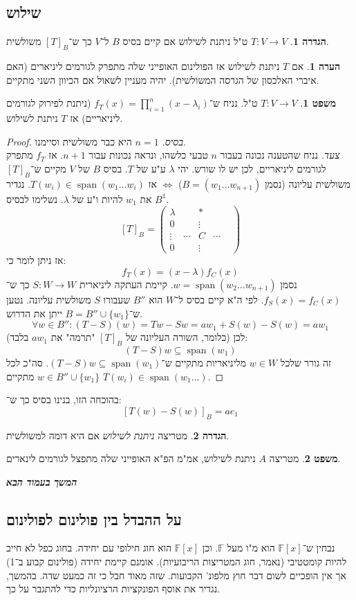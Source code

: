 \documentclass[a4paper]{article}
\newcommand\npage {\vfil {\hfil \textbf{\textit{המשך בעמוד הבא}}} \hfil \vfil \pagebreak}
\DeclareMathOperator{\Sp}      {span}
\newcommand\F         {\mathbb{F}}
\newcommand\co        {\colon}
\newcommand\pms[1]    {\begin{pmatrix}
		#1
\end{pmatrix}}
\renewcommand\lg      {\lambda}
\theoremstyle{definition}
\newtheorem{Theorem}{\color{myblue}משפט}
\newtheorem{Definition}{\color{mygreen}הגדרה}
\newtheorem{Remark}{\color{mycyan}הערה}
\newcommand\theo  [1] {\begin{Theorem}#1\end{Theorem}}
\newcommand\defi  [1] {\begin{Definition}#1\end{Definition}}
\newcommand\rmark [1] {\begin{Remark}#1\end{Remark}}
\begin{document}
	\subsection{שילוש}
	\defi{$T \co V \to V$ ט"ל ניתנת לשילוש אם קיים בסיס $B$ ל־$V$ כך ש־$[T]_B$ משולשית. }
	
	\rmark{אם $T$ ניתנת לשילוש אז הפולינום האופייני שלה מתפרק לגורמים ליניארים (האם איברי האלכסון של הגרסה המשולשית). יהיה מעניין לשאול אם הכיוון השני מתקיים. }
	
	\theo{$T \co V \to V$ ט"ל. נניח ש־$f_T(x) = \prod_{i = 1}^{n}(x - \lg_i)$ (ניתנת לפירוק לגורמים ליניאריים) אז $T$ ניתנת לשילוש. }
	\begin{proof}
		\textit{בסיס. }$n = 1$ היא כבר משולשית וסיימנו. \\
		\textit{צעד. }נניח שהטענה נכונה בעבור $n$ טבעי כלשהו, ונראה נכונות עבור $n + 1$. אז $f_T$ מתפרק לגורמים ליניאריים, לכן יש לו שורש. יהי $\lg$ ע"ע של $T$. בסיס $B$ של $V$ מקיים ש־$[T]_B$ משולשית עליונה (נסמן $B = (w_1 \dots w_{n + 1})$) $\iff$ אז $T(w_i) \in \Sp(w_1 \dots w_i)$. נגדיר את $w_1$ להיות ו"ע של $\lg$. נשלימו לבסיס $B^1$. 
		\[ [T]_B = \pms{\lg & & * && \\ 0 && \vdots \\ \vdots &\cdots & C & \cdots \\ 0 & &\vdots } \]
		אז ניתן לומר כי: 
		\[ f_T(x) = (x - \lg) f_C(x) \]
		נסמן $w = \Sp(w_2 \dots w_{n + 1})$. קיימת העתקה ליניארית $S \co W \to W$ כך ש־$f_S(x) = f_C(x)$. לפי ה"א קיים בסיס ל־$W$ הוא $B''$ שעבורו $S$ משולשית עליונה. נטען ש־$B = B'' \cup \{w_1\}$ ייתן את הדרוש. 
		\[ \forall w \in B'' \co (T - S)(w) = Tw - Sw = aw_1 + S(w) - S(w) = aw_1 \]
		(כלומר, השורה העליונה של $[T]_B$ "תרמה" את $aw_1$ בלבד)
		לכן: 
		\[ (T - S)w \subseteq \Sp(w_1) \]
		זה גורר שלכל $w \in W$ מליניאריות מתקיים ש־$(T - S)w \subseteq \Sp(w_1)$. סה"כ לכל $w \in B'' \cup \{w_1\}$ מתקיים $T(w_i) \in \Sp(w_1 \dots)$. 
	\end{proof}
	
	בהוכחה הזו, בנינו בסיס כך ש־: 
	\[ [T(w) - S(w)]_B = ae_1 \]
	
	\defi{מטריצה \textit{ניתנת לשילוש} אם היא  דומה למשולשית. }
	\theo{מטריצה $A$ ניתנת לשילוש, אמ"מ הפ"א האופייני שלה מתפצל לגורמים לינארים. }
	
	\renewcommand{\footrule}{\rule{\linewidth-26pt}{0.25pt}\vspace{-5pt}}
	\npage
	\subsection{על ההבדל בין פולינום לפולינום}
	נבחין ש־$\F[x]$ הוא מ"ו מעל $\F$. וכן $\F[x]$ הוא חוג חילופי עם יחידה. בחוג כפל לא חייב להיות קומטטיבי (נאמר, חוג המטריצות הריבועיות). אומנם קיימת יחידה (פולינום קבוע ב־1) אך אין הופכיים לשום דבר חוץ מלפונ' הקבועות. שזה מאוד חבל כי זה כמעט שדה. בהמשך, נגדיר את אוסף הפונקציות הרציונליות כדי להתגבר על כך. 
	
\end{document}
